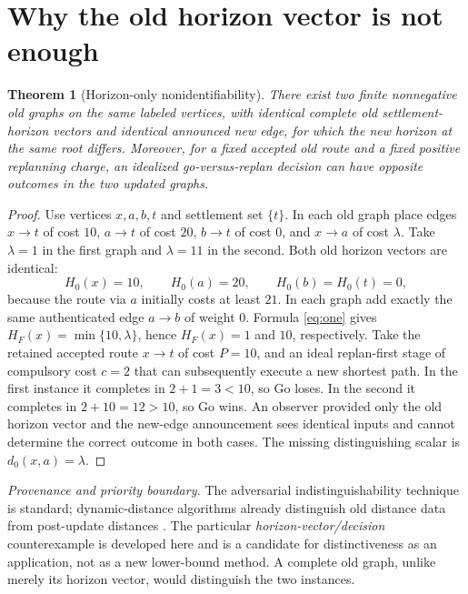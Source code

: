 \documentclass[11pt,letterpaper]{article}
\newtheorem{theorem}{Theorem}[section]
\newcommand{\attrib}[1]{\par\noindent\textit{Provenance and priority boundary.} #1\par}
\begin{document}
\section{Why the old horizon vector is not enough}
\begin{theorem}[Horizon-only nonidentifiability]\label{thm:inadequate}
There exist two finite nonnegative old graphs on the same labeled vertices, with identical complete old settlement-horizon vectors and identical announced new edge, for which the new horizon at the same root differs. Moreover, for a fixed accepted old route and a fixed positive replanning charge, an idealized go-versus-replan decision can have opposite outcomes in the two updated graphs.
\end{theorem}
\begin{proof}
Use vertices $x,a,b,t$ and settlement set $\{t\}$. In each old graph place edges $x\to t$ of cost $10$, $a\to t$ of cost $20$, $b\to t$ of cost $0$, and $x\to a$ of cost $\lambda$. Take $\lambda=1$ in the first graph and $\lambda=11$ in the second. Both old horizon vectors are identical:
\[
H_0(x)=10,\qquad H_0(a)=20,\qquad H_0(b)=H_0(t)=0,
\]
because the route via $a$ initially costs at least $21$. In each graph add exactly the same authenticated edge $a\to b$ of weight $0$. Formula \eqref{eq:one} gives $H_F(x)=\min\{10,\lambda\}$, hence $H_F(x)=1$ and $10$, respectively. Take the retained accepted route $x\to t$ of cost $P=10$, and an ideal replan-first stage of compulsory cost $c=2$ that can subsequently execute a new shortest path. In the first instance it completes in $2+1=3<10$, so Go loses. In the second it completes in $2+10=12>10$, so Go wins. An observer provided only the old horizon vector and the new-edge announcement sees identical inputs and cannot determine the correct outcome in both cases. The missing distinguishing scalar is $d_0(x,a)=\lambda$.
\end{proof}
\attrib{The adversarial indistinguishability technique is standard; dynamic-distance algorithms already distinguish old distance data from post-update distances \cite{Dynamic,Demetrescu}. The particular \emph{horizon-vector/decision} counterexample is developed here and is a candidate for distinctiveness as an application, not as a new lower-bound method. A complete old graph, unlike merely its horizon vector, would distinguish the two instances.}
\end{document}
